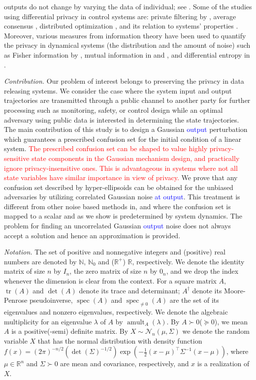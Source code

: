 \documentclass{ifacconf}
\DeclareMathOperator{\tr}{tr}
\DeclareMathOperator{\spec}{spec}
\DeclareMathOperator{\Alg}{amult}
\newcommand{\calN}{\ensuremath{\mathcal{N}}}
\newcommand{\R}{\ensuremath{\mathbb R}}
\newcommand{\N}{\ensuremath{\mathbb N}}
\newcommand{\+}{\mathsmaller{+}}
\newcommand{\blue}[1]{\textcolor{blue}{#1}}
\newcommand{\red}[1]{\textcolor{red}{#1}}
\begin{document}
outputs do not change by varying the data of
individual; see \cite{dwork2014algorithmic}. Some of the studies using differential privacy in control systems are: private filtering  by \cite{le2013differentially}, average consensus \cite{nozari2017differentially}, distributed optimization \cite{han2016differentially}, \cite{hale2017cloud} and its relation to systems' properties \cite{kawano2020design}. 
Moreover, various measures from information theory have been used to quantify the privacy in dynamical systems (the distribution and the amount of noise) such as Fisher information by \cite{farokhi2019ensuring}, mutual information in  \cite{tanaka2016semidefinite} and  \cite{murguia2021privacy}, and differential entropy in \cite{hayati2021finite}. 
\par \textit{Contribution.} Our problem of interest belongs to preserving the privacy in data releasing systems. We consider the case where the system input and output trajectories are transmitted through a public channel to another party for further processing such as monitoring, safety, or control design while an optimal adversary using public data is interested in determining the state trajectories.
The main contribution of this study is to design a Gaussian \blue{output} perturbation which guarantees a prescribed confusion set for the initial condition of a linear system.
\red{The prescribed confusion set can be shaped to value highly privacy-sensitive state components in the Gaussian mechanism design, and practically ignore privacy-insensitive ones.
This is advantageous in systems where not all state variables have similar importance in view of privacy. }
We prove that any confusion set described by hyper-ellipsoids can be obtained for the unbiased adversaries by utilizing correlated Gaussian noise \blue{at output}. 
This treatment is different from other noise based methods in, \cite{le2013differentially} and \cite{murguia2021privacy} where the confusion set is mapped to a scalar and as we show is predetermined by system dynamics.
The problem for finding an uncorrelated Gaussian \blue{output} noise does not always accept a solution and hence an approximation is provided. 
\par \textit{Notation.} 
The set of positive and nonnegative integers and (positive) real numbers are denoted by $\N$, $\N_{0}$ and ($\R^{+}$) $\R$, respectively. We denote the identity matrix of size $n$ by $I_n$, the zero matrix of size $n$ by $0_n$, and we drop the index whenever the dimension is clear from the context. For a square matrix $A$, $\tr(A)$ and $\det(A)$ denote its trace and determinant; $A^{\dag}$ denote its Moore-Penrose pseudoinverse, $\spec(A)$ and $\spec_{\neq0}(A)$ are the set of its eigenvalues and nonzero eigenvalues, respectively. We denote the algebraic multiplicity for an eigenvalue $\lambda$ of $A$ by $\Alg_{A}(\lambda)$. By $A \succ0$($\succeq 0$), we mean $A$ is a positive(-semi) definite matrix. By $X \sim \calN_n(\mu, \Sigma)$ we denote the random variable $X$ that has the normal distribution with density function $f(x) = (2\pi)^{-n/2}(\det(\Sigma)^{-1/2})\exp(-\frac{1}{2}(x-\mu)^{\top}\Sigma^{-1}(x-\mu))$, where $\mu \in \R^{n}$ and $\Sigma \succ 0$ are mean and covariance, respectively, and $x$ is a realization of $X$.
\end{document}
